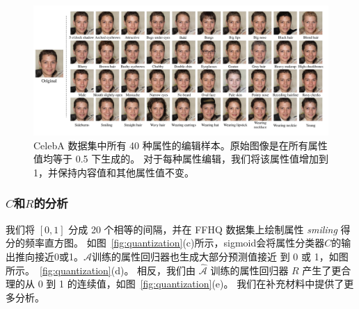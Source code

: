 \begin{figure}[!t]
    \begin{center}
       \includegraphics[width=0.9\linewidth]{figures/ACGAN/40Attributes.pdf}
    \end{center}
    \caption{CelebA 数据集中所有 40 种属性的编辑样本。原始图像是在所有属性值均等于 0.5 下生成的。 对于每种属性编辑，我们将该属性值增加到 1，并保持内容值和其他属性值不变。}
    \label{fig:40Attributes}
\end{figure}

\subsubsection{$C$和$R$的分析}
我们将 $[0,1]$ 分成 20 个相等的间隔，并在 FFHQ 数据集上绘制属性 \textit{smiling} 得分的频率直方图。 如图~\ref{fig:quantization}(c)所示，sigmoid会将属性分类器$C$的输出推向接近0或1。$\mathcal{A}$训练的属性回归器也生成大部分预测值接近 到 0 或 1，如图所示。~\ref{fig:quantization}(d)。 相反，我们由 $\hat{\mathcal{A}}$ 训练的属性回归器 $R$ 产生了更合理的从 0 到 1 的连续值，如图~\ref{fig:quantization}(e)。 我们在补充材料中提供了更多分析。

